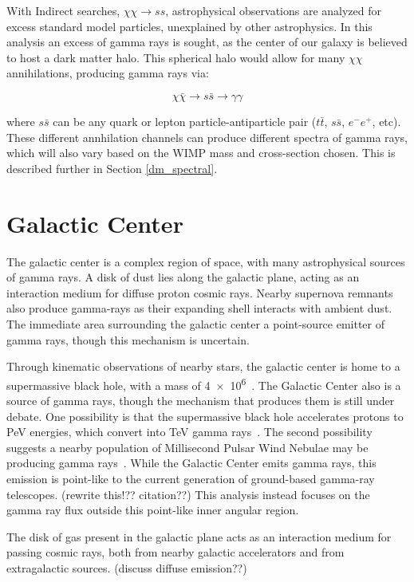     With Indirect searches, $\chi\chi \rightarrow ss$, astrophysical observations are analyzed for excess standard model particles, unexplained by other astrophysics.
    In this analysis an excess of gamma rays is sought, as the center of our galaxy is believed to host a dark matter halo.
    This spherical halo would allow for many $\chi\chi$ annihilations, producing gamma rays via: 

    $$\chi\bar{\chi} \rightarrow s\bar{s} \rightarrow \gamma\gamma$$

    where $s\bar{s}$ can be any quark or lepton particle-antiparticle pair ($t\bar{t}$, $s\bar{s}$, $e^{-}e^{+}$, etc).
    These different annhilation channels can produce different spectra of gamma rays, which will also vary based on the WIMP mass and cross-section chosen.
    This is described further in Section \ref{dm_spectral}.


\section{Galactic Center}

  The galactic center is a complex region of space, with many astrophysical sources of gamma rays.
  A disk of dust lies along the galactic plane, acting as an interaction medium for diffuse proton cosmic rays.
  Nearby supernova remnants also produce gamma-rays as their expanding shell interacts with ambient dust.
  The immediate area surrounding the galactic center a point-source emitter of gamma rays, though this mechanism is uncertain.

  Through kinematic observations of nearby stars, the galactic center is home to a supermassive black hole, with a mass of \SI{4e6}{\Msol}~\cite{sgra_massdist}.
  The Galactic Center also is a source of \TeV{} gamma rays, though the mechanism that produces them is still under debate.
  One possibility is that the supermassive black hole accelerates protons to PeV energies, which convert into TeV gamma rays~\cite{gc_pevatron}.
  The second possibility suggests a nearby population of Millisecond Pulsar Wind Nebulae may be producing gamma rays~\cite{gc_pulsars}.
  While the Galactic Center emits gamma rays, this emission is point-like to the current generation of ground-based gamma-ray telescopes. {\color{red}(rewrite this!?? citation??)}
  This analysis instead focuses on the gamma ray flux outside this point-like inner angular region.

  The disk of gas present in the galactic plane acts as an interaction medium for passing cosmic rays, both from nearby galactic accelerators and from extragalactic sources.
  {\color{red}(discuss diffuse emission??)}

